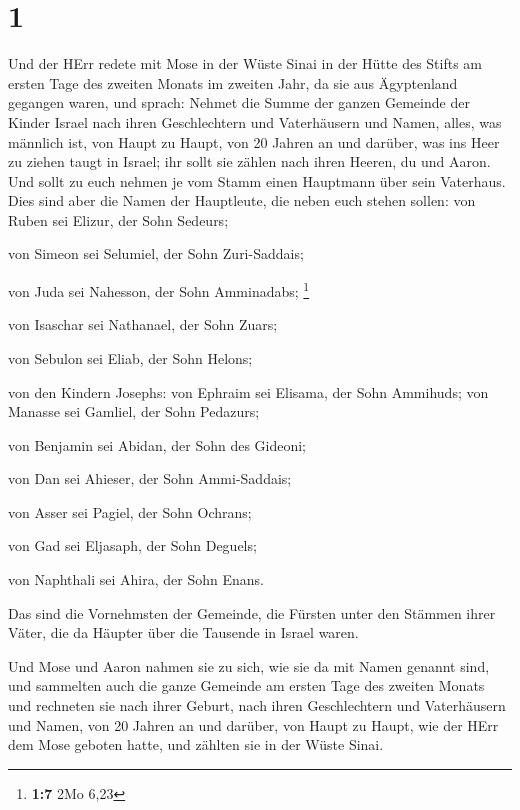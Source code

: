 \hypertarget{section}{%
\section{1}\label{section}}

 Und der HErr redete mit Mose in der Wüste Sinai in der
Hütte des Stifts am ersten Tage des zweiten Monats im zweiten Jahr, da
sie aus Ägyptenland gegangen waren, und sprach:  Nehmet die
Summe der ganzen Gemeinde der Kinder Israel nach ihren Geschlechtern und
Vaterhäusern und Namen, alles, was männlich ist, von Haupt zu Haupt,
 von 20 Jahren an und darüber, was ins Heer zu ziehen taugt
in Israel; ihr sollt sie zählen nach ihren Heeren, du und Aaron.
 Und sollt zu euch nehmen je vom Stamm einen Hauptmann über
sein Vaterhaus.  Dies sind aber die Namen der Hauptleute,
die neben euch stehen sollen: von Ruben sei Elizur, der Sohn Sedeurs;

 von Simeon sei Selumiel, der Sohn Zuri-Saddais;

 von Juda sei Nahesson, der Sohn Amminadabs; \footnote{\textbf{1:7}
  2Mo 6,23}

 von Isaschar sei Nathanael, der Sohn Zuars;

 von Sebulon sei Eliab, der Sohn Helons;

 von den Kindern Josephs: von Ephraim sei Elisama, der Sohn
Ammihuds; von Manasse sei Gamliel, der Sohn Pedazurs;

 von Benjamin sei Abidan, der Sohn des Gideoni;

 von Dan sei Ahieser, der Sohn Ammi-Saddais;

 von Asser sei Pagiel, der Sohn Ochrans;

 von Gad sei Eljasaph, der Sohn Deguels;

 von Naphthali sei Ahira, der Sohn Enans.

 Das sind die Vornehmsten der Gemeinde, die Fürsten unter
den Stämmen ihrer Väter, die da Häupter über die Tausende in Israel
waren.

 Und Mose und Aaron nahmen sie zu sich, wie sie da mit
Namen genannt sind,  und sammelten auch die ganze Gemeinde
am ersten Tage des zweiten Monats und rechneten sie nach ihrer Geburt,
nach ihren Geschlechtern und Vaterhäusern und Namen, von 20 Jahren an
und darüber, von Haupt zu Haupt,  wie der HErr dem Mose
geboten hatte, und zählten sie in der Wüste Sinai.

